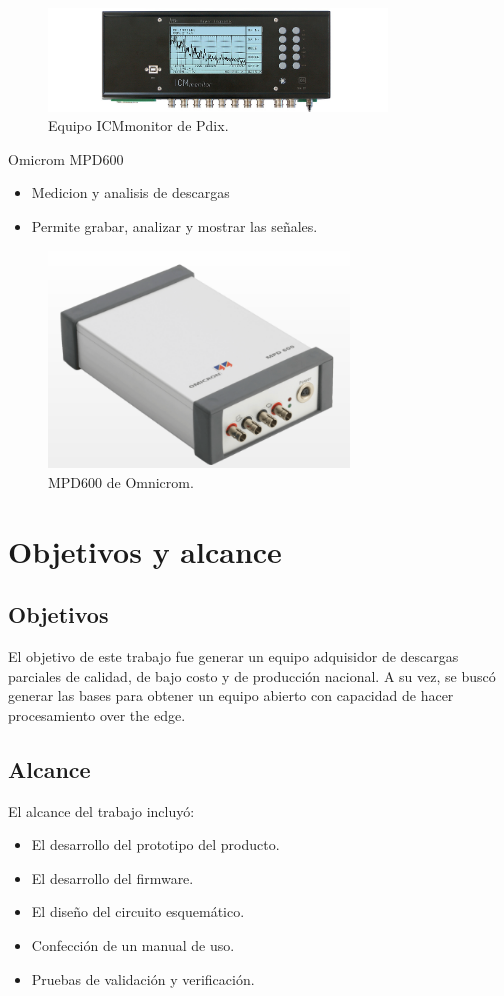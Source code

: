 \begin{figure}[h!]
	\centering
	\includegraphics[width=90mm]{./Figures/arte2.png}
	\caption{Equipo ICMmonitor de Pdix.}
	\label{fig:arte2}
\end{figure}


Omicrom MPD600
\begin{itemize}
\item Medicion y analisis de descargas
\item Permite grabar, analizar y mostrar las señales.
\end{itemize}

\begin{figure}[h!]
	\centering
	\includegraphics[width=80mm]{./Figures/arte3.png}
	\caption{MPD600 de Omnicrom.}
	\label{fig:arte3}
\end{figure}

\section{Objetivos y alcance}
\subsection{Objetivos}
El objetivo de este trabajo fue generar un equipo adquisidor de descargas parciales de calidad, de bajo costo y de producción nacional. A su vez, se buscó generar las bases para obtener un equipo abierto con capacidad de hacer procesamiento over the edge. 

\subsection{Alcance}
El alcance del trabajo incluyó:
\begin{itemize}
\item El desarrollo del prototipo del producto.
\item El desarrollo del firmware.
\item El diseño del circuito esquemático.
\item Confección de un manual de uso.
\item Pruebas de validación y verificación.
\end{itemize}

